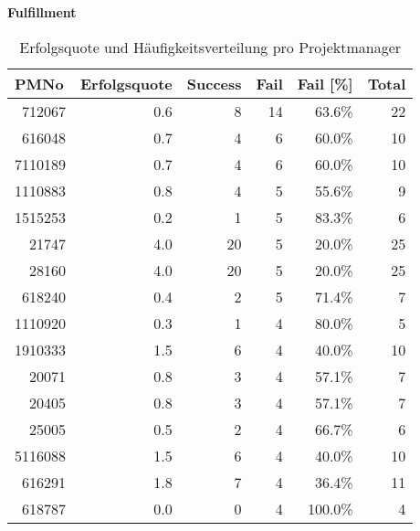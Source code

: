 \textbf{Fulfillment}
\begin{longtable}{lrrrrr}
	\caption{Erfolgsquote und Häufigkeitsverteilung pro Projektmanager}\\
	\textbf{PMNo} & \multicolumn{1}{c}{\textbf{Erfolgsquote}} & {\textbf{Success}} &
	\textbf{Fail} & \textbf{Fail [\%]} & \textbf{Total} \\\hline\endhead
	        \multicolumn{1}{r}{712067} & 0.6   & 8     & 14    & 63.6\% & 22 \\
	    \multicolumn{1}{r}{616048} & 0.7   & 4     & 6     & 60.0\% & 10 \\
	    \multicolumn{1}{r}{7110189} & 0.7   & 4     & 6     & 60.0\% & 10 \\
	    \multicolumn{1}{r}{1110883} & 0.8   & 4     & 5     & 55.6\% & 9 \\
	    \multicolumn{1}{r}{1515253} & 0.2   & 1     & 5     & 83.3\% & 6 \\
	    \multicolumn{1}{r}{21747} & 4.0   & 20    & 5     & 20.0\% & 25 \\
	    \multicolumn{1}{r}{28160} & 4.0   & 20    & 5     & 20.0\% & 25 \\
	    \multicolumn{1}{r}{618240} & 0.4   & 2     & 5     & 71.4\% & 7 \\
	    \multicolumn{1}{r}{1110920} & 0.3   & 1     & 4     & 80.0\% & 5 \\
	    \multicolumn{1}{r}{1910333} & 1.5   & 6     & 4     & 40.0\% & 10 \\
	    \multicolumn{1}{r}{20071} & 0.8   & 3     & 4     & 57.1\% & 7 \\
	    \multicolumn{1}{r}{20405} & 0.8   & 3     & 4     & 57.1\% & 7 \\
	    \multicolumn{1}{r}{25005} & 0.5   & 2     & 4     & 66.7\% & 6 \\
	    \multicolumn{1}{r}{5116088} & 1.5   & 6     & 4     & 40.0\% & 10 \\
	    \multicolumn{1}{r}{616291} & 1.8   & 7     & 4     & 36.4\% & 11 \\
	    \multicolumn{1}{r}{618787} & 0.0   & 0     & 4     & 100.0\% & 4 \\

\end{longtable}
